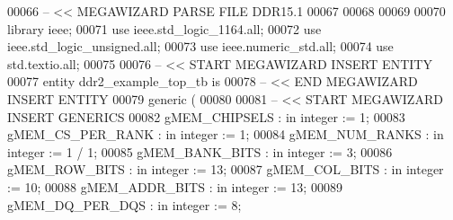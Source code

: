 \begin{DoxyCode}
00066 \textcolor{keyword}{-- << MEGAWIZARD PARSE FILE DDR15.1}
00067 
00068 
00069 
00070 \textcolor{vhdlkeyword}{library }\textcolor{keywordflow}{ieee};
00071 \textcolor{vhdlkeyword}{use }ieee.std\_logic\_1164.\textcolor{keywordflow}{all};
00072 \textcolor{vhdlkeyword}{use }ieee.std\_logic\_unsigned.\textcolor{keywordflow}{all};
00073 \textcolor{vhdlkeyword}{use }ieee.numeric\_std.\textcolor{keywordflow}{all};
00074 \textcolor{vhdlkeyword}{use }std.textio.\textcolor{keywordflow}{all};
00075 
00076 \textcolor{keyword}{-- << START MEGAWIZARD INSERT ENTITY}
00077 \textcolor{keywordflow}{entity }ddr2_example_top_tb \textcolor{keywordflow}{is}
00078 \textcolor{keyword}{-- << END MEGAWIZARD INSERT ENTITY}
00079     \textcolor{keywordflow}{generic} \textcolor{vhdlchar}{(}
00080 
00081 \textcolor{keyword}{-- << START MEGAWIZARD INSERT GENERICS}
00082         \textcolor{vhdlchar}{gMEM_CHIPSELS}          \textcolor{vhdlchar}{:} \textcolor{keywordflow}{in} \textcolor{comment}{integer} \textcolor{vhdlchar}{:=} \textcolor{vhdllogic}{}\textcolor{vhdllogic}{1};
00083         \textcolor{vhdlchar}{gMEM_CS_PER_RANK}       \textcolor{vhdlchar}{:} \textcolor{keywordflow}{in} \textcolor{comment}{integer} \textcolor{vhdlchar}{:=} \textcolor{vhdllogic}{}\textcolor{vhdllogic}{1};
00084         \textcolor{vhdlchar}{gMEM_NUM_RANKS}         \textcolor{vhdlchar}{:} \textcolor{keywordflow}{in} \textcolor{comment}{integer} \textcolor{vhdlchar}{:=} \textcolor{vhdllogic}{}\textcolor{vhdllogic}{1} \textcolor{vhdlchar}{/} \textcolor{vhdllogic}{}\textcolor{vhdllogic}{1};
00085         \textcolor{vhdlchar}{gMEM_BANK_BITS}         \textcolor{vhdlchar}{:} \textcolor{keywordflow}{in} \textcolor{comment}{integer} \textcolor{vhdlchar}{:=} \textcolor{vhdllogic}{}\textcolor{vhdllogic}{3};
00086         \textcolor{vhdlchar}{gMEM_ROW_BITS}          \textcolor{vhdlchar}{:} \textcolor{keywordflow}{in} \textcolor{comment}{integer} \textcolor{vhdlchar}{:=} \textcolor{vhdllogic}{}\textcolor{vhdllogic}{13};
00087         \textcolor{vhdlchar}{gMEM_COL_BITS}          \textcolor{vhdlchar}{:} \textcolor{keywordflow}{in} \textcolor{comment}{integer} \textcolor{vhdlchar}{:=} \textcolor{vhdllogic}{}\textcolor{vhdllogic}{10};
00088         \textcolor{vhdlchar}{gMEM_ADDR_BITS}         \textcolor{vhdlchar}{:} \textcolor{keywordflow}{in} \textcolor{comment}{integer} \textcolor{vhdlchar}{:=} \textcolor{vhdllogic}{}\textcolor{vhdllogic}{13};
00089         \textcolor{vhdlchar}{gMEM_DQ_PER_DQS}        \textcolor{vhdlchar}{:} \textcolor{keywordflow}{in} \textcolor{comment}{integer} \textcolor{vhdlchar}{:=} \textcolor{vhdllogic}{}\textcolor{vhdllogic}{8};

\end{DoxyCode}

